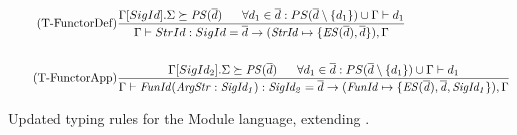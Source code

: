 \begin{figure}[htb]
\begin{align*}
\tag{T-FunctorDef}
&\frac
{\Gamma[SigId].\Sigma \succeq \mathit{PS}(\overline{d})
\;\;\;\;\;\;
\forall d_{1} \in \overline{d} : PS(\overline{d}\setminus \{ d_{1}\}) \cup \Gamma \vdash d_{1}}
{\Gamma \vdash StrId : SigId = \overline{d} \rightarrow (\mathit{StrId} \mapsto \lbrace \mathit{ES}(\overline{d}), \overline{d}\rbrace),\Gamma}
\\
\\
\tag{T-FunctorApp}
&\frac
{\Gamma[SigId_{2}].\Sigma \succeq \mathit{PS}(\overline{d})
\;\;\;\;\;\;
\forall d_{1} \in \overline{d} : PS(\overline{d}\setminus \{ d_{1}\}) \cup \Gamma \vdash d_{1}}
{\Gamma \vdash \mathit{FunId(ArgStr:SigId_{1}):SigId_{2}} = \overline{d} \rightarrow (\mathit{FunId \mapsto \lbrace ES(\overline{d}), \overline{d}, SigId_{1}\rbrace}),\Gamma}
\end{align*}
\caption[Updated Typing Rules: Module Language]{Updated typing rules for the Module language, extending . \label{fig:UpdatedTypeRulesModule}}
\end{figure}